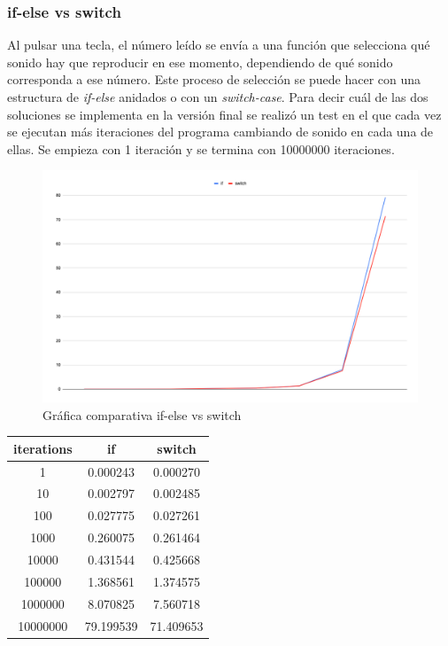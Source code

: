 \documentclass{article}
\begin{document}
    \subsubsection{if-else vs switch}
    Al pulsar una tecla, el número leído se envía a una función que selecciona qué sonido hay que reproducir en
    ese momento, dependiendo de qué sonido corresponda a ese número. Este proceso de selección se puede hacer
    con una estructura de \textit{if-else} anidados o con un \textit{switch-case}.\newline
    Para decir cuál de las dos soluciones se implementa en la versión final se realizó un test en el que cada
    vez se ejecutan más iteraciones del programa cambiando de sonido en cada una de ellas. Se empieza con 1
    iteración y se termina con 10000000 iteraciones.\newline
    \begin{figure}[ht]
        \centering
        \includegraphics[width=\textwidth]{grafica_if_switch}
        \caption{Gráfica comparativa if-else vs switch}
    \end{figure}
    \newline
    \begin{center}
        \begin{tabular}{ |c|c|c| }
            \hline
                iterations & if & switch \\
                \hline\hline
                1 & 0.000243 & 0.000270 \\
                \hline
                10 & 0.002797 & 0.002485 \\
                \hline
                100 & 0.027775 & 0.027261 \\
                \hline
                1000 & 0.260075 & 0.261464 \\
                \hline
                10000 & 0.431544 & 0.425668 \\
                \hline
                100000 & 1.368561 & 1.374575 \\
                \hline
                1000000 & 8.070825 & 7.560718 \\
                \hline
                10000000 & 79.199539 & 71.409653 \\
            \hline
        \end{tabular}
    \end{center}
\end{document}
